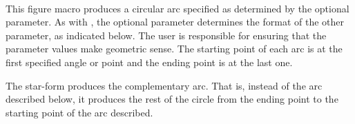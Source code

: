 \documentclass[letterpaper]{article}
\begin{document}
\begin{cd}
\\
%
%
\end{cd}

This figure macro produces a circular arc specified as determined by the
 optional parameter. As with , the optional
 parameter determines the format of the other parameter, as
indicated below. The user is responsible for ensuring that the parameter
values make geometric sense. The starting point of each arc is at the
first specified angle or point and the ending point is at the last one.

The star-form produces the complementary arc. That is, instead of the
arc described below, it produces the rest of the circle from the ending
point to the starting point of the arc described.

\begin{cd}
\\
\\
\\
\\
\\
\\
%
%
\end{cd}
\end{document}

